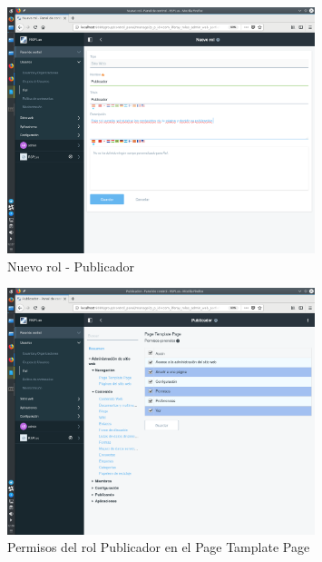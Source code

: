 \begin{figure}[H]
\begin{center}
\includegraphics[width=0.8\textwidth]{./img/liferay/16.png}
\end{center}
\caption{Nuevo rol - Publicador}
\label{img:lr16}
\end{figure}

\begin{figure}[H]
\begin{center}
\includegraphics[width=0.8\textwidth]{./img/liferay/17.png}
\end{center}
\caption{Permisos del rol Publicador en el Page Tamplate Page}
\label{img:lr17}
\end{figure}

